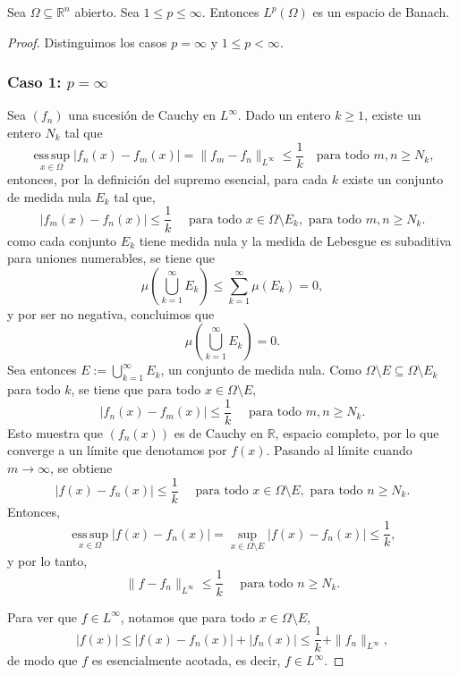   Sea $\Omega \subseteq \mathbb{R}^n$ abierto. Sea $1 \leq p \leq \infty$. Entonces $L^p(\Omega)$ es un espacio de Banach.

  \begin{proof}
Distinguimos los casos \( p = \infty \) y \( 1 \leq p < \infty \).

\subsubsection*{Caso 1: \( p = \infty \)}

Sea \( (f_n) \) una sucesión de Cauchy en \( L^\infty \). Dado un entero \( k \geq 1 \), existe un entero \( N_k \) tal que
\[
\operatorname*{ess\,sup}_{x \in \Omega} |f_n(x) - f_m(x)| = \|f_m - f_n\|_{L^\infty} \leq \frac{1}{k} \quad \text{para todo } m, n \geq N_k,
\]
entonces, por la definición del supremo esencial, para cada \( k \) existe un conjunto de medida nula \( E_k \) tal que,
\[
|f_m(x) - f_n(x)| \leq \frac{1}{k} \quad \text{ para todo } x \in \Omega \setminus E_k, \text{ para todo } m, n \geq N_k.
\]
como cada conjunto \( E_k \) tiene medida nula y la medida de Lebesgue es subaditiva para uniones numerables, se tiene que
\[
\mu\left( \bigcup_{k=1}^\infty E_k \right) \leq \sum_{k=1}^\infty \mu(E_k) = 0,
\]
y por ser no negativa, concluimos que
\[
\mu\left( \bigcup_{k=1}^\infty E_k \right) = 0.
\]
Sea entonces \( E := \bigcup_{k=1}^\infty E_k \), un conjunto de medida nula. Como \( \Omega \setminus E \subseteq \Omega \setminus E_k \) para todo \( k \), se tiene que para todo \( x \in \Omega \setminus E \),
\[
|f_n(x) - f_m(x)| \leq \frac{1}{k} \quad \text{ para todo } m, n \geq N_k.
\]
Esto muestra que \( (f_n(x)) \) es de Cauchy en \( \mathbb{R} \), espacio completo, por lo que converge a un límite que denotamos por \( f(x) \). Pasando al límite cuando \( m \to \infty \), se obtiene
\[
|f(x) - f_n(x)| \leq \frac{1}{k} \quad \text{ para todo } x \in \Omega \setminus E, \text{ para todo } n \geq N_k.
\]
Entonces,
\[
\operatorname*{ess\,sup}_{x \in \Omega} |f(x) - f_n(x)| = \sup_{x \in \Omega \setminus E} |f(x) - f_n(x)| \leq \frac{1}{k},
\]
y por lo tanto,
\[
\|f - f_n\|_{L^\infty} \leq \frac{1}{k} \quad \text{ para todo } n \geq N_k.
\]

Para ver que \( f \in L^\infty \), notamos que para todo \( x \in \Omega \setminus E \),
\[
|f(x)| \leq |f(x) - f_n(x)| + |f_n(x)| \leq \frac{1}{k} + \|f_n\|_{L^\infty},
\]
de modo que \( f \) es esencialmente acotada, es decir, \( f \in L^\infty \).


\end{proof}
